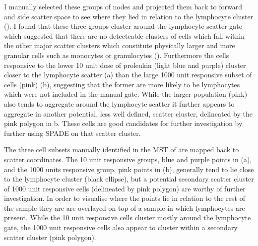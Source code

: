 I manually selected these groups of nodes and projected them back to forward and side scatter space to see where they lied in relation
to the lymphocyte cluster ().  
I found that these three groups cluster around the lymphocyte scatter gate which suggested that
there are no detecteable clusters of cells which fall within the other major scatter clusters which constitute physically larger and more granular cells such as monocytes
or granulocytes ().
Furthermore the cells responsive to the lower 10 unit dose of proleukin (light blue and purple) cluster closer to the lymphocyte scatter
(a)
than the large 1000 unit responsive subset of cells (pink) (b),
suggesting that the former are more likely to be lymphocytes which were not included in the manual gate.
While the larger population (pink) also tends to aggregate around the lymphocyte scatter it
further appears to aggregate in another potential, less well defined, scatter cluster, delineated by the pink polygon in b.
These cells are good candidates for further investigation by further using SPADE on that scatter cluster.


{
  The three cell subsets manually identified in the \gls{MST} of   are mapped back to scatter coordinates.
  The 10 unit responsive groups, blue and purple points in (a), and the 1000 units responsive group, pink points in (b),
  generally tend to lie close to the lymphocyte cluster (black ellipse), but a potential secondary scatter cluster of 1000 unit responsive cells
  (delineated by pink polygon) are worthy of further investigation.
}
{
  In order to visualise where the points lie in relation to the rest of the sample they are are overlayed on top of a sample in which lymphocytes are present.
  While the 10 unit responsive cells cluster mostly around the lymphocyte gate, 
  the 1000 unit responsive cells also appear to cluster within a secondary scatter cluster (pink polygon).
}


